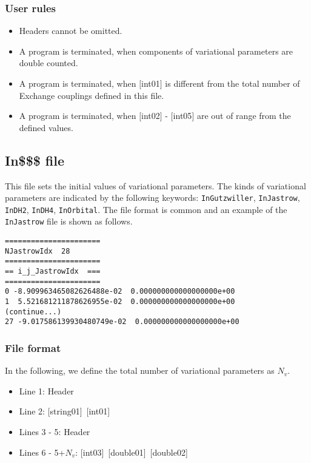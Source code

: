 \subsubsection{User rules}
\begin{itemize}
\item Headers cannot be omitted. 
\item A program is terminated, when components of variational parameters are double counted.
\item A program is terminated, when $[$int01$]$ is different from the total number of Exchange couplings defined in this file.
\item A program is terminated, when $[$int02$]$ - $[$int05$]$ are out of range from the defined values.
\end{itemize}

\newpage
\subsection{In\$\$\$ file}
\label{Subsec:InputParam}
This file sets the initial values of variational parameters.
The kinds of variational parameters are indicated by the following keywords:
\verb|InGutzwiller|, \verb|InJastrow|, \verb|InDH2|, \verb|InDH4|, \verb|InOrbital|.
The file format is common and an example of the \verb|InJastrow| file is shown as follows.

\begin{minipage}{12.5cm}
\begin{screen}
\begin{verbatim}
======================
NJastrowIdx  28
====================== 
== i_j_JastrowIdx  ===
====================== 
0 -8.909963465082626488e-02  0.000000000000000000e+00
1  5.521681211878626955e-02  0.000000000000000000e+00
(continue...)
27 -9.017586139930480749e-02  0.000000000000000000e+00
\end{verbatim}
\end{screen}
\end{minipage}

\subsubsection{File format}
In the following, we define the total number of variational parameters as $N_v$.
 \begin{itemize}
   \item  Line 1: Header
   \item  Line 2: [string01]~[int01]
   \item  Lines 3 - 5:  Header
   \item  Lines 6 - 5+$N_v$: [int03]~[double01]~[double02]
  \end{itemize}
